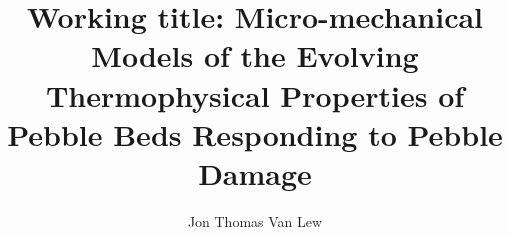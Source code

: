 \documentclass [PhD] {uclathes}
\title          {Working title: Micro-mechanical Models of the Evolving Thermophysical Properties of Pebble Beds Responding to Pebble Damage}
\author         {Jon Thomas Van Lew}
\begin{document}
\makeintropages














\end{document}
